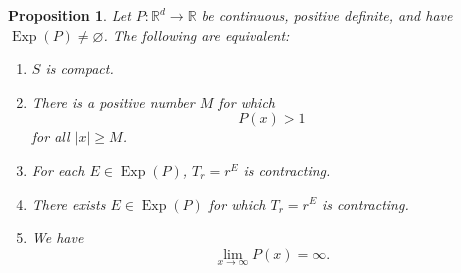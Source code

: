\documentclass[11pt, letter]{book}
\newtheorem{proposition}[theorem]{Proposition}
\newcommand\Exp{\operatorname{Exp}}
\begin{document}
\begin{framed}
\begin{proposition}\label{prop:PositiveHomogeneousCharacterization}
Let $P:\mathbb{R}^d\to\mathbb{R}$ be continuous, positive definite, and have $\Exp(P)\neq \varnothing$. The following are equivalent:
\begin{enumerate}[label=(\alph*), ref=(\alph*)]
\item\label{cond:SisCompact} $S$ is compact.
\item\label{cond:PisAboveOne} There is a positive number $M$ for which
\begin{equation*}
P(x)>1
\end{equation*}
for all $|x|\geq M$. 
\item\label{cond:Contracting} For each $E\in\Exp(P)$, $T_r=r^E$ is contracting.
\item\label{cond:ThereExistsContracting} There exists $E\in\Exp(P)$ for which $T_r=r^E$ is contracting.
\item\label{cond:InfiniteLimit} We have
\begin{equation*}
\lim_{x\to\infty}P(x)=\infty.
\end{equation*}
\end{enumerate}
\end{proposition}
\end{framed}
\end{document}
